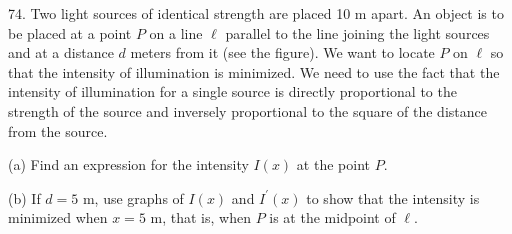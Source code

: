 \documentclass{sebase}
\begin{document}
\begin{multicols}{2}
\begin{ExerciseList}
\begin{ExerciseList}
%

%
\vspace*{6pt}
\end{ExerciseList}

\hspace*{\fill}\hspace*{\fill}

\item[\hfill 74.] 
\GCALCX%
Two light sources of identical strength are placed 10 m apart. An object is
to be placed at a point $P$ on a line $\ell $ parallel to the line joining
the light sources and at a distance $d$ meters from it (see the figure). We
want to locate $P$ on $\ell $ so that the intensity of illumination is
minimized. We need to use the fact that the intensity of illumination for a
single source is directly proportional to the strength of the source and
inversely proportional to the square of the distance from the source.

\begin{ExerciseList}
\item[(a)] Find an expression for the intensity $I(x)$ at the point $P$.

%

\item[(b)] If $d=5$ m, use graphs of $I(x)$ and $I^{\prime }(x)$ to show
that the intensity is minimized when $x=5$ m, that is, when $P$ is at the
midpoint of $\ell $.

%


\end{ExerciseList}
\end{ExerciseList}
\end{multicols}
\end{document}
